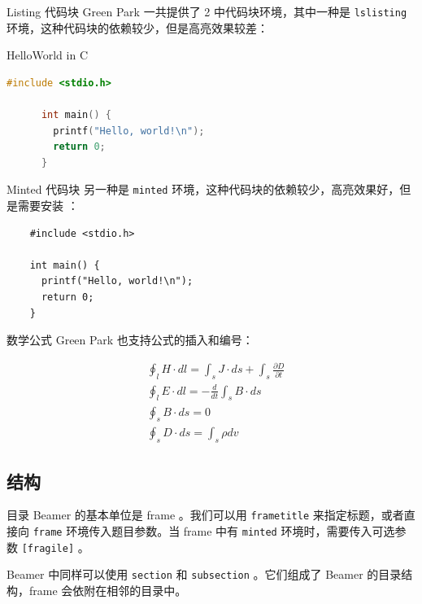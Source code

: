 \documentclass{ctexbeamer}
\begin{document}
\begin{frame}[fragile]{Listing 代码块}
  Green Park 一共提供了 2 中代码块环境，其中一种是 \texttt{lslisting} 环境，这种代码块的依赖较少，但是高亮效果较差：
  
  \begin{block}{HelloWorld in C}
    \begin{lstlisting}[language=c]  
      #include <stdio.h>

      int main() {
        printf("Hello, world!\n");
        return 0;
      }
    \end{lstlisting}
  \end{block}

\end{frame}

\begin{frame}[fragile]{Minted 代码块}
  另一种是 \texttt{minted} 环境，这种代码块的依赖较少，高亮效果好，但是需要安装 ：
  \begin{verbatim}
    #include <stdio.h>

    int main() {
      printf("Hello, world!\n");
      return 0;
    }
  \end{verbatim}

\end{frame}

\begin{frame}{数学公式}
  Green Park 也支持公式的插入和编号：
  
  \begin{align}
    &\oint_{l} H \cdot dl=\int_{s}J\cdot ds+ \int_{s} \frac {\partial D} {\partial t} \\
    &\oint_{l} E \cdot dl=-\frac {d}{dt}\int_{s}B\cdot ds \\
    &\oint_{s}B\cdot ds=0 \\
    &\oint_{s}D\cdot ds=\int_{s}\rho dv
  \end{align}
\end{frame}

\subsection{结构}
\begin{frame}[fragile]{目录}
  Beamer 的基本单位是 frame 。我们可以用 \texttt{frametitle} 来指定标题，或者直接向 \texttt{frame} 环境传入题目参数。当 frame 中有 \texttt{minted} 环境时，需要传入可选参数 \texttt{[fragile]} 。

  Beamer 中同样可以使用 \texttt{section} 和 \texttt{subsection} 。它们组成了 Beamer 的目录结构，frame 会依附在相邻的目录中。
\end{frame}
\end{document}
